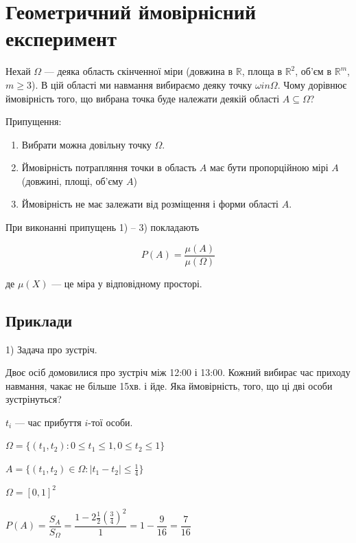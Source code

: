 \section{Геометричний ймовірнісний експеримент}

\begin{problem}
    Нехай $\Omega$ --- деяка область скінченної міри (довжина в $\mathbb{R}$,
    площа в $\mathbb{R}^2$, об'єм в $\mathbb{R}^m$, $m \geqslant 3$). В цій
    області ми навмання вибираємо деяку точку $\omega in \Omega$.
    Чому дорівнює ймовірність того, що вибрана точка буде
    належати деякій області $A \subseteq \Omega$? 
\end{problem}

Припущення:

\begin{enumerate}
    \item Вибрати можна довільну точку $\Omega$.
    \item Ймовірність потрапляння точки в область $A$
    має бути пропорційною мірі $A$ (довжині, площі, об'єму $A$)

    \item Ймовірність не має залежати від розміщення і форми
    області $A$.
\end{enumerate}

При виконанні припущень 1) -- 3) покладають

$$P(A) = \dfrac{\mu(A)}{\mu(\Omega)}$$

де $\mu(X)$ --- це міра у відповідному просторі.

\subsection{Приклади}

1) Задача про зустріч.

Двоє осіб домовилися про зустріч між 12:00 і 13:00. Кожний
вибирає час приходу навмання, чакає не більше 15хв. і йде.
Яка ймовірність, того, що ці дві особи зустрінуться?

$t_i$ --- час прибуття  $i$-тої особи.

$\Omega = \{(t_1, t_2): 0 \leqslant t_1 \leqslant 1, 0 \leqslant t_2 \leqslant 1\}$

$A = \{(t_1, t_2) \in \Omega: |t_1-t_2| \leqslant \frac{1}{4}\}$

\beautifulImage

$\Omega = [0,1]^2$

$P(A) = \dfrac{S_A}{S_{\Omega}}
= \dfrac{1-2\frac{1}{2}(\frac{3}{4})^2}{1}
= 1 - \dfrac{9}{16}
= \dfrac{7}{16}$

